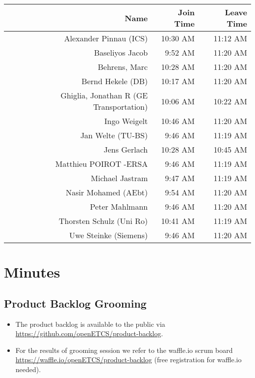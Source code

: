 \documentclass[a4paper, 11pt]{article}
\begin{document}
\begin{table}[htbp]
    \begin{tabular}{rrr}
    \toprule
    \textbf{Name} & \textbf{Join Time} & \textbf{Leave Time} \\
    \midrule
    Alexander Pinnau (ICS) & 10:30 AM & 11:12 AM \\
    Baseliyos Jacob & 9:52 AM & 11:20 AM \\
    Behrens, Marc & 10:28 AM & 11:20 AM \\
    Bernd Hekele (DB) & 10:17 AM & 11:20 AM \\
    Ghiglia, Jonathan R (GE Transportation) & 10:06 AM & 10:22 AM \\
    Ingo Weigelt & 10:46 AM & 11:20 AM \\
    Jan Welte (TU-BS) & 9:46 AM & 11:19 AM \\
    Jens Gerlach & 10:28 AM & 10:45 AM \\
    Matthieu POIROT -ERSA & 9:46 AM & 11:19 AM \\
    Michael Jastram & 9:47 AM & 11:19 AM \\
    Nasir Mohamed (AEbt) & 9:54 AM & 11:20 AM \\
    Peter Mahlmann & 9:46 AM & 11:20 AM \\
    Thorsten Schulz (Uni Ro) & 10:41 AM & 11:19 AM \\
    Uwe Steinke (Siemens) & 9:46 AM & 11:20 AM \\
    \bottomrule
    \end{tabular}%
  \label{tab:addlabel}%
\end{table}%






\section{Minutes}

\subsection{Product Backlog Grooming}
\begin{itemize}
\item The product backlog is available to the public via 
\url{https://github.com/openETCS/product-backlog}. 
\item For the results of grooming session we refer to the waffle.io scrum board \url{https://waffle.io/openETCS/product-backlog} (free registration for waffle.io needed).
\end{itemize}
\end{document}

